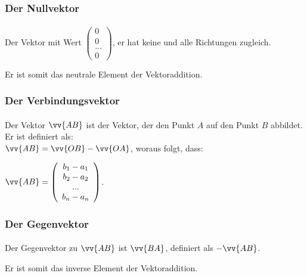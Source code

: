         \subsubsection{Der Nullvektor}

            \paragraph{} Der Vektor mit Wert $\left(\begin{array}{c} 0 \\ 0 \\ ...\\0\end{array}\right)$, er hat keine und alle Richtungen zugleich.
            \begin{Bemerkung}
                Er ist somit das neutrale Element der Vektoraddition.
            \end{Bemerkung}

        \subsubsection{Der Verbindungsvektor}

            \paragraph{} Der Vektor $\vv{AB}$ ist der Vektor, der den Punkt $A$ auf den Punkt $B$ abbildet. Er ist definiert als:\\ $\vv{AB}=\vv{OB}-\vv{OA}$, woraus folgt, dass: \begin{center} $\vv{AB} = \left(\begin{array}{c} b_1 - a_1 \\ b_2 - a_2 \\ ... \\ b_n - a_n \end{array}\right)$. \end{center}

        \subsubsection{Der Gegenvektor}

            \paragraph{} Der Gegenvektor zu $\vv{AB}$ ist $\vv{BA}$, definiert als  $-\vv{AB}$.
            \begin{Bemerkung}
                Er ist somit das inverse Element der Vektoraddition.
            \end{Bemerkung}


